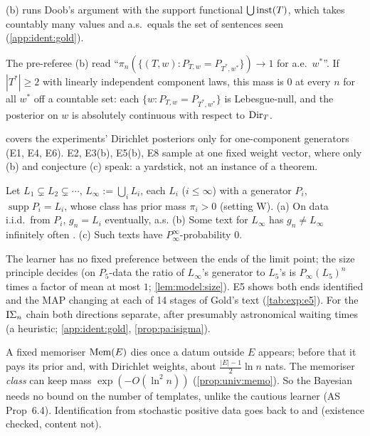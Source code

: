 \noindent (b) runs Doob's argument with the support functional $\bigcup\mathrm{inst}(T)$, which takes countably many values and a.s.\ equals the set of sentences seen (\cref{app:ident:gold}).

\begin{remark}\identbrk{}\label{rem:ident:exact}
The pre-referee (b) read ``$\pi_n(\{(T,w):P_{T,w}=P_{T^*,w^*}\})\to1$ for a.e.\ $w^*$''. If $|T^*|\ge2$ with linearly independent component laws, this mass is $0$ at every $n$ for all $w^*$ off a countable set: each $\{w:P_{T,w}=P_{T^*,w^*}\}$ is Lebesgue-null, and the posterior on $w$ is absolutely continuous with respect to $\mathrm{Dir}_T$.
\end{remark}

\begin{remark}\identbrk{}\label{rem:ident:x5}
 covers the experiments' Dirichlet posteriors only for one-component generators (E1, E4, E6). E2, E3(b), E5(b), E8 sample at one fixed weight vector, where only (b) and conjecture (c) speak: a yardstick, not an instance of a theorem.
\end{remark}

\begin{proposition}\identbrk{}\label{prop:ident:gold}
Let $L_1\subsetneq L_2\subsetneq\cdots$, $L_\infty:=\bigcup_iL_i$, each $L_i$ ($i\le\infty$) with a generator $P_i$, $\operatorname{supp}P_i=L_i$, whose class has prior mass $\pi_i>0$ (setting W). (a) On data i.i.d.\ from $P_i$, $g_n=L_i$ eventually, a.s. (b) Some text for $L_\infty$ has $g_n\ne L_\infty$ infinitely often \citep{gold1967language}. (c) Such texts have $P_\infty^\infty$-probability $0$.
\end{proposition}

\noindent The learner has no fixed preference between the ends of the limit point; the size principle decides (on $P_5$-data the ratio of $L_\infty$'s generator to $L_5$'s is $P_\infty(L_5)^n$ times a factor of mean at most $1$; \cref{lem:model:size}). E5 shows both ends identified and the MAP changing at each of 14 stages of Gold's text (\cref{tab:exp:e5}). For the $\mathrm{I}\Sigma_{n}$ chain both directions separate, after presumably astronomical waiting times (a heuristic; \cref{app:ident:gold}, \cref{prop:pa:isigma}).

\begin{remark}\identbrk{}\label{rem:ident:memo}
A fixed memoriser $\mathrm{Mem}(E)$ dies once a datum outside $E$ appears; before that it pays its prior and, with Dirichlet weights, about $\frac{|E|-1}2\ln n$ nats. The memoriser \emph{class} can keep mass $\exp(-O(\ln^2n))$ (\cref{prop:univ:memo}). So the Bayesian needs no bound on the number of templates, unlike the cautious learner (AS Prop~6.4). Identification from stochastic positive data goes back to \citet{horning1969study} and \citet{angluin1988identifying} (existence checked, content not).
\end{remark}

